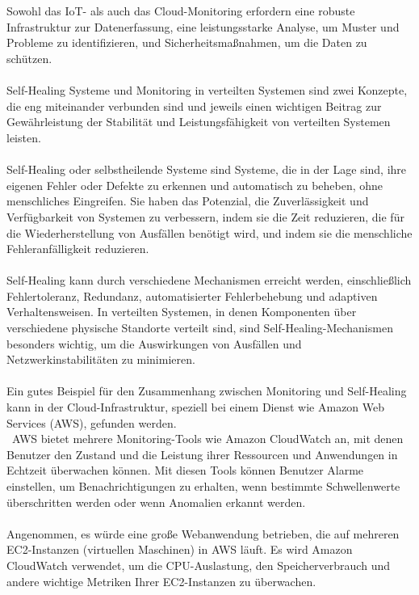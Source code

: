 \\\\
Sowohl das IoT- als auch das Cloud-Monitoring erfordern eine robuste Infrastruktur zur Datenerfassung, eine leistungsstarke Analyse, um Muster und Probleme zu identifizieren, und Sicherheitsmaßnahmen, um die Daten zu schützen. 
\\\\
Self-Healing Systeme und Monitoring in verteilten Systemen sind zwei Konzepte, die eng miteinander verbunden sind und jeweils einen wichtigen Beitrag zur Gewährleistung der Stabilität und Leistungsfähigkeit von verteilten Systemen leisten.
\\\\
Self-Healing oder selbstheilende Systeme sind Systeme, die in der Lage sind, ihre eigenen Fehler oder Defekte zu erkennen und automatisch zu beheben, ohne menschliches Eingreifen. Sie haben das Potenzial, die Zuverlässigkeit und Verfügbarkeit von Systemen zu verbessern, indem sie die Zeit reduzieren, die für die Wiederherstellung von Ausfällen benötigt wird, und indem sie die menschliche Fehleranfälligkeit reduzieren.
\\\\
Self-Healing kann durch verschiedene Mechanismen erreicht werden, einschließlich Fehlertoleranz, Redundanz, automatisierter Fehlerbehebung und adaptiven Verhaltensweisen. In verteilten Systemen, in denen Komponenten über verschiedene physische Standorte verteilt sind, sind Self-Healing-Mechanismen besonders wichtig, um die Auswirkungen von Ausfällen und Netzwerkinstabilitäten zu minimieren.
\\\\
Ein gutes Beispiel für den Zusammenhang zwischen Monitoring und Self-Healing kann in der Cloud-Infrastruktur, speziell bei einem Dienst wie Amazon Web Services (AWS), gefunden werden.
\\\
AWS bietet mehrere Monitoring-Tools wie Amazon CloudWatch an, mit denen Benutzer den Zustand und die Leistung ihrer Ressourcen und Anwendungen in Echtzeit überwachen können. Mit diesen Tools können Benutzer Alarme einstellen, um Benachrichtigungen zu erhalten, wenn bestimmte Schwellenwerte überschritten werden oder wenn Anomalien erkannt werden.
\\\\
Angenommen, es würde  eine große Webanwendung betrieben, die auf mehreren EC2-Instanzen (virtuellen Maschinen) in AWS läuft. Es wird  Amazon CloudWatch verwendet, um die CPU-Auslastung, den Speicherverbrauch und andere wichtige Metriken Ihrer EC2-Instanzen zu überwachen.
